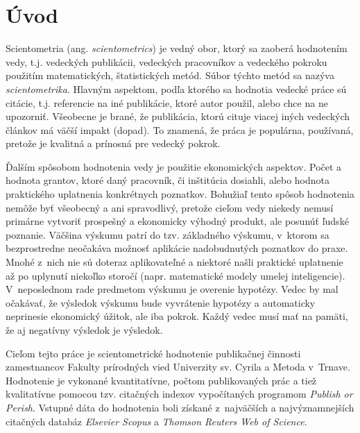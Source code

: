 \chapter*{Úvod}

Scientometria (ang. \emph{scientometrics}) je vedný obor, ktorý sa zaoberá
hodnotením vedy, t.j. vedeckých publikácii, vedeckých pracovníkov a vedeckého
pokroku použitím matematických, štatistických metód.  Súbor týchto metód sa
nazýva \emph{scientometrika}.  Hlavným aspektom, podľa ktorého sa hodnotia
vedecké práce sú citácie, t.j. referencie na iné publikácie, ktoré autor použil,
alebo chce na ne upozorniť.  Všeobecne je brané, že publikácia, ktorú cituje
viacej iných vedeckých článkov má väčší impakt (dopad).  To znamená, že práca je
populárna, používaná, pretože je kvalitná a prínosná pre vedecký pokrok.

Ďalším spôsobom hodnotenia vedy je použitie ekonomických aspektov.  Počet a
hodnota grantov, ktoré daný pracovník, či inštitúcia dosiahli, alebo hodnota
praktického uplatnenia konkrétnych poznatkov.  Bohužiaľ tento spôsob hodnotenia
nemôže byť všeobecný a ani spravodlivý, pretože cieľom vedy niekedy nemusí
primárne vytvoriť prospešný a ekonomicky výhodný produkt, ale posunúť ľudské
poznanie.  Väčšina výskumu patrí do tzv.  základného výskumu, v~ktorom sa
bezprostredne neočakáva možnosť aplikácie nadobudnutých poznatkov do
praxe. Mnohé z~nich nie sú doteraz aplikovateľné a niektoré našli praktické
uplatnenie až po uplynutí niekoľko storočí (napr. matematické modely umelej
inteligencie).  V~neposlednom rade predmetom výskumu je overenie hypotézy.
Vedec by mal očakávať, že výsledok výskumu bude vyvrátenie hypotézy a
automaticky neprinesie ekonomický úžitok, ale iba pokrok.  Každý vedec musí mať
na pamäti, že aj negatívny výsledok je výsledok.

Cieľom tejto práce je scientometrické hodnotenie publikačnej činnosti
zamestnancov Fakulty prírodných vied Univerzity sv. Cyrila a Metoda v~Trnave.
Hodnotenie je vykonané kvantitatívne, počtom publikovaných prác a tiež
kvalitatívne pomocou tzv. citačných indexov vypočítaných programom \emph{Publish
  or Perish}.  Vstupné dáta do hodnotenia boli získané z~najväčších a
najvýznamnejších citačných databáz \emph{Elsevier Scopus} a \emph{Thomson
  Reuters Web of Science}.

